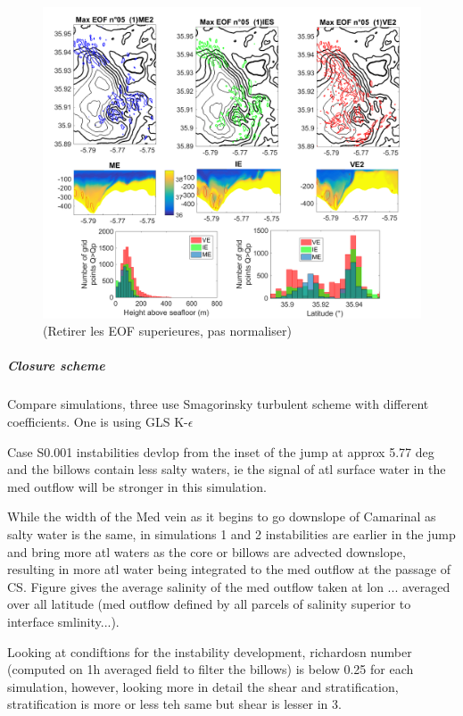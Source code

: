 \begin{figure}[!h]
 \includegraphics[width=\textwidth]{./GBR3D/EOF5_MIV_2D.png}
 \caption {(Retirer les EOF superieures, pas normaliser)}
\end{figure}


\subparagraph{Closure scheme}

Compare simulations, three use Smagorinsky turbulent scheme with different coefficients. One is using GLS K-$\epsilon$

Case S0.001 instabilities devlop from the inset of the jump at approx 5.77 deg and the billows contain less salty waters, ie the signal of atl surface water in the med outflow will be stronger in this simulation.


While the width of the Med vein as it begins to go downslope of Camarinal as salty water is the same, in simulations 1 and 2 instabilities are earlier in the jump and bring more atl waters as the core or billows are advected downslope, resulting in more atl water being integrated to the med outflow at the passage of CS. Figure gives the average salinity of the med outflow taken at lon ... averaged over all latitude (med outflow defined by all parcels of salinity superior to interface smlinity...).

Looking at condiftions for the instability development, richardosn number (computed on 1h averaged field to filter the billows) is below 0.25 for each simulation, however, looking more in detail the shear and stratification, stratification is more or less teh same but shear is lesser in 3.

